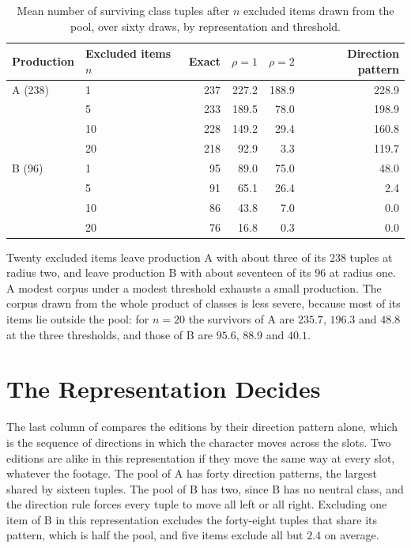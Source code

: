 \documentclass[11pt,twoside,openright]{book}
\theoremstyle{plain}
\theoremstyle{definition}
\theoremstyle{remark}
\begin{document}
\begin{table}[ht]
\centering
\begin{tabular}{@{}llrrrr@{}}
\toprule
Production & Excluded items $n$ & Exact & $\rho=1$ & $\rho=2$ & Direction pattern\\
\midrule
A (238) & 1 & 237 & 227.2 & 188.9 & 228.9\\
 & 5 & 233 & 189.5 & 78.0 & 198.9\\
 & 10 & 228 & 149.2 & 29.4 & 160.8\\
 & 20 & 218 & 92.9 & 3.3 & 119.7\\
\midrule
B (96) & 1 & 95 & 89.0 & 75.0 & 48.0\\
 & 5 & 91 & 65.1 & 26.4 & 2.4\\
 & 10 & 86 & 43.8 & 7.0 & 0.0\\
 & 20 & 76 & 16.8 & 0.3 & 0.0\\
\bottomrule
\end{tabular}
\caption{Mean number of surviving class tuples after $n$ excluded items drawn from the pool, over sixty draws, by representation and threshold.}\label{tab:surv15}
\end{table}

Twenty excluded items leave production A with about three of its $238$ tuples at radius two, and leave production B with about seventeen of its $96$ at radius one. A modest corpus under a modest threshold exhausts a small production. The corpus drawn from the whole product of classes is less severe, because most of its items lie outside the pool: for $n=20$ the survivors of A are $235.7$, $196.3$ and $48.8$ at the three thresholds, and those of B are $95.6$, $88.9$ and $40.1$.

\section{The Representation Decides}\label{sec:repr15}

The last column of  compares the editions by their direction pattern alone, which is the sequence of directions in which the character moves across the slots. Two editions are alike in this representation if they move the same way at every slot, whatever the footage. The pool of A has forty direction patterns, the largest shared by sixteen tuples. The pool of B has two, since B has no neutral class, and the direction rule forces every tuple to move all left or all right. Excluding one item of B in this representation excludes the forty-eight tuples that share its pattern, which is half the pool, and five items exclude all but $2.4$ on average.
\end{document}
